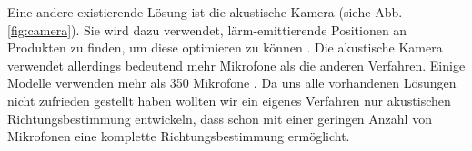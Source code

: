   Eine andere existierende Lösung ist die akustische Kamera (siehe Abb. \ref{fig:camera}). Sie wird dazu verwendet, lärm-emittierende Positionen an Produkten zu finden, um diese optimieren zu können \cite{camera}. Die akustische Kamera verwendet allerdings bedeutend mehr Mikrofone als die anderen Verfahren. Einige Modelle verwenden mehr als 350 Mikrofone \cite{nmics}. Da uns alle vorhandenen Lösungen nicht zufrieden gestellt haben wollten wir ein eigenes Verfahren nur akustischen Richtungsbestimmung entwickeln, dass schon mit einer geringen Anzahl von Mikrofonen eine komplette Richtungsbestimmung ermöglicht.
